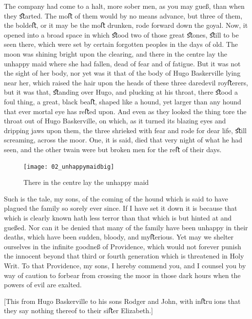 \documentclass[paper=5.5in:8.5in,BCOR=7mm,twoside,DIV=calc,12pt,usegeometry,openany,chapterprefix,endperiod,headings=big]{scrbook} %
\begin{document}
The company had come to a halt, more sober men, as you may gueß, than when they ﬆarted. The moﬅ of them would by no means advance, but three of them, the boldeﬅ, or it may be the moﬅ drunken, rode forward down the goyal. Now, it opened into a broad space in which ﬆood two of those great ﬆones, ﬆill to be seen there, which were set by certain forgotten peoples in the days of old. The moon was shining bright upon the clearing, and there in the centre lay the unhappy maid where she had fallen, dead of fear and of fatigue. But it was not the sight of her body, nor yet was it that of the body of Hugo Baskerville lying near her, which raised the hair upon the heads of these three daredevil royﬅerers, but it was that, ﬆanding over Hugo, and plucking at his throat, there ﬆood a foul thing, a great, black beaﬅ, shaped like a hound, yet larger than any hound that ever mortal eye has reﬅed upon. And even as they looked the thing tore the throat out of Hugo Baskerville, on which, as it turned its blazing eyes and dripping jaws upon them, the three shrieked with fear and rode for dear life, ﬆill screaming, across the moor. One, it is said, died that very night of what he had seen, and the other twain were but broken men for the reﬅ of their days.

\begin{figure}[tbph]
\centering
\texttt{[image: 02\_unhappymaidbig]}
\caption{There in the centre lay the unhappy maid}
\end{figure}

Such is the tale, my sons, of the coming of the hound which is said to have plagued the family so sorely ever since. If I have set it down it is because that which is clearly known hath less terror than that which is but hinted at and gueßed. Nor can it be denied that many of the family have been unhappy in their deaths, which have been sudden, bloody, and myﬅerious. Yet may we shelter ourselves in the inﬁnite goodneß of Providence, which would not forever punish the innocent beyond that third or fourth generation which is threatened in Holy Writ. To that Providence, my sons, I hereby commend you, and I counsel you by way of caution to forbear from crossing the moor in those dark hours when the powers of evil are exalted.

[This from Hugo Baskerville to his sons Rodger and John, with inﬅruions that they say nothing thereof to their siﬅer Elizabeth.]

\vfill

\normalfont
\end{document}
